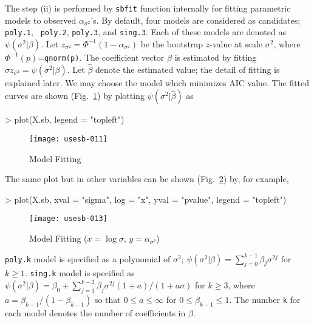 \documentclass[a4paper]{amsart}
\begin{document}
The step (ii) is performed by {\tt sbfit} function internally for
fitting parametric models to observed $\alpha_{\sigma^2}$'s.  By
default, four models are considered as candidates; {\tt poly.1}, {\tt
poly.2}, {\tt poly.3}, and {\tt sing.3}. Each of these models are
denoted as $\psi(\sigma^2|\beta)$. Let $z_{\sigma^2} = \Phi^{-1}( 1 -
\alpha_{\sigma^2})$ be the bootstrap $z$-value at scale $\sigma^2$,
where $\Phi^{-1}(p)$={\tt qnorm(p)}.  The coefficient vector $\beta$
is estimated by fitting $\sigma z_{\sigma^2} = \psi(\sigma^2 |
\beta)$.  Let $\hat\beta$ denote the estimated value; the detail of
fitting is explained later.  We may choose the model which minimizes
AIC value. The fitted curves are shown (Fig.~\ref{fig:diag1f}) by plotting
$\psi(\sigma^2|\hat\beta)$ as
\begin{Schunk}
\begin{Sinput}
> plot(X.sb, legend = "topleft")
\end{Sinput}
\end{Schunk}
\begin{figure}
\begin{center}
\texttt{[image: usesb-011]}
\caption{Model Fitting}\label{fig:diag1f}
\end{center}
\end{figure}
The same plot but in other variables can be shown
(Fig.~\ref{fig:diag1f2}) by, for example,
\begin{Schunk}
\begin{Sinput}
> plot(X.sb, xval = "sigma", log = "x", yval = "pvalue", legend = "topleft")
\end{Sinput}
\end{Schunk}
\begin{figure}
\begin{center}
\texttt{[image: usesb-013]}
\caption{Model Fitting ($x=\log \sigma$, $y=\alpha_{\sigma^2}$)}
\label{fig:diag1f2}
\end{center}
\end{figure}



{\tt poly.k} model is specified as a polynomial of $\sigma^2$;
$\psi(\sigma^2|\beta) = \sum_{j=0}^{k-1} \beta_j \sigma^{2j}$ for
$k\ge1$.  {\tt sing.k} model is specified as $\psi(\sigma^2|\beta) =
\beta_0 + \sum_{j=1}^{k-2} \beta_j \sigma^{2j} (1+a)/(1+a \sigma)$ for
$k\ge3$, where $a=\beta_{k-1}/(1-\beta_{k-1})$ so that $0\le a \le
\infty$ for $0\le\beta_{k-1}\le1$. The number {\tt k} for each model
denotes the number of coefficients in $\beta$.
\end{document}
